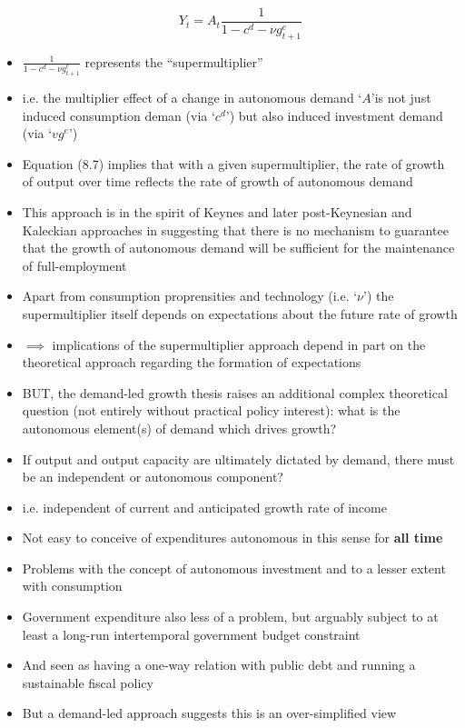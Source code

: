 \documentclass{article}
\begin{document}
\begin{itemize}
	\begin{equation}
		Y_t = A_t \frac{1}{1 - c^d - \nu g_{t+1}^e} \label{eq:8.7}
	\end{equation}
	\item \( \frac{1}{1 - c^d - \nu g_{t+1}^e} \) represents the ``supermultiplier''
	\item i.e. the multiplier effect of a change in autonomous demand `\( A \)'is not just induced consumption deman (via `\( c^d \)') but also induced investment demand (via `\( v g^e \)')
	\item Equation (8.7) implies that with a given supermultiplier, the rate of growth of output over time reflects the rate of growth of autonomous demand
	\item This approach is in the spirit of Keynes and later post-Keynesian and Kaleckian approaches in suggesting that there is no mechanism to guarantee that the growth of autonomous demand will be sufficient for the maintenance of full-employment
	\item Apart from consumption proprensities and technology (i.e. `\( \nu \)') the supermultiplier itself depends on expectations about the future rate of growth
	\item \( \implies \) implications of the supermultiplier approach depend in part on the theoretical approach regarding the formation of expectations
	\item BUT, the demand-led growth thesis raises an additional  complex theoretical question (not entirely without practical policy interest): what is the autonomous element(s) of demand which drives growth?
	\item If output and output capacity are ultimately dictated by demand, there must be an independent or autonomous component?
	\item i.e. independent of current and anticipated growth rate of income
	\item Not easy to conceive of expenditures autonomous in this sense for \textbf{all time}
	\item Problems with the concept of autonomous investment and to a lesser extent with consumption
	\item Government expenditure also less of a problem, but arguably subject to at least a long-run intertemporal government budget constraint
	\item And seen as having a one-way relation with public debt and running a sustainable fiscal policy
	\item But a demand-led approach suggests this is an over-simplified view

\end{itemize}
\end{document}
